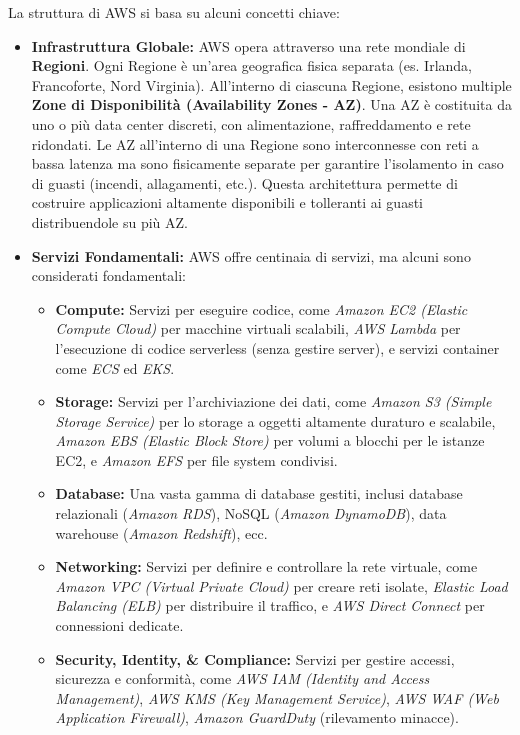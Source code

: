 \documentclass[a4paper,12pt]{report}
\begin{document}
La struttura di AWS si basa su alcuni concetti chiave:

\begin{itemize}
    \item \textbf{Infrastruttura Globale:} AWS opera attraverso una rete mondiale di \textbf{Regioni}. Ogni Regione è un'area geografica fisica separata (es. Irlanda, Francoforte, Nord Virginia). All'interno di ciascuna Regione, esistono multiple \textbf{Zone di Disponibilità (Availability Zones - AZ)}. Una AZ è costituita da uno o più data center discreti, con alimentazione, raffreddamento e rete ridondati. Le AZ all'interno di una Regione sono interconnesse con reti a bassa latenza ma sono fisicamente separate per garantire l'isolamento in caso di guasti (incendi, allagamenti, etc.). Questa architettura permette di costruire applicazioni altamente disponibili e tolleranti ai guasti distribuendole su più AZ.
    \item \textbf{Servizi Fondamentali:} AWS offre centinaia di servizi, ma alcuni sono considerati fondamentali:
        \begin{itemize}
            \item \textbf{Compute:} Servizi per eseguire codice, come \textit{Amazon EC2 (Elastic Compute Cloud)} per macchine virtuali scalabili, \textit{AWS Lambda} per l'esecuzione di codice serverless (senza gestire server), e servizi container come \textit{ECS} ed \textit{EKS}.
            \item \textbf{Storage:} Servizi per l'archiviazione dei dati, come \textit{Amazon S3 (Simple Storage Service)} per lo storage a oggetti altamente duraturo e scalabile, \textit{Amazon EBS (Elastic Block Store)} per volumi a blocchi per le istanze EC2, e \textit{Amazon EFS} per file system condivisi.
            \item \textbf{Database:} Una vasta gamma di database gestiti, inclusi database relazionali (\textit{Amazon RDS}), NoSQL (\textit{Amazon DynamoDB}), data warehouse (\textit{Amazon Redshift}), ecc.
            \item \textbf{Networking:} Servizi per definire e controllare la rete virtuale, come \textit{Amazon VPC (Virtual Private Cloud)} per creare reti isolate, \textit{Elastic Load Balancing (ELB)} per distribuire il traffico, e \textit{AWS Direct Connect} per connessioni dedicate.
            \item \textbf{Security, Identity, \& Compliance:} Servizi per gestire accessi, sicurezza e conformità, come \textit{AWS IAM (Identity and Access Management)}, \textit{AWS KMS (Key Management Service)}, \textit{AWS WAF (Web Application Firewall)}, \textit{Amazon GuardDuty} (rilevamento minacce).

\end{itemize}
\end{itemize}
\end{document}
